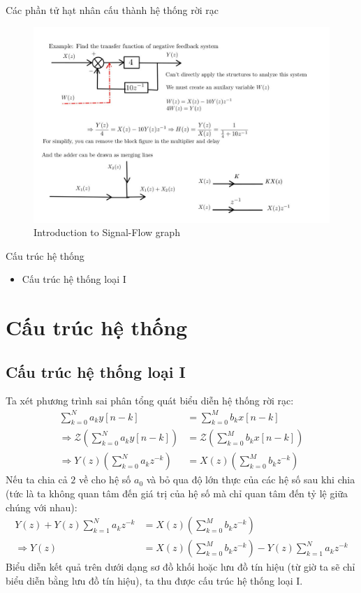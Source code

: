 \documentclass[8pt]{beamer}
\begin{document}
\begin{frame}{Các phần tử hạt nhân cấu thành hệ thống rời rạc}
\begin{figure}[h]
			\includegraphics[width=1\textwidth]{3.jpg}
			\caption{Introduction to Signal-Flow graph}			\label{fig:re3}

		\end{figure}
\end{frame}
\begin{frame}{Cấu trúc hệ thống}
\begin{itemize}
	\item Cấu trúc hệ thống loại I
\end{itemize}
\section{Cấu trúc hệ thống}
\subsection{Cấu trúc hệ thống loại I}
Ta xét phương trình sai phân tổng quát biểu diễn hệ thống rời rạc:
\begin{equation*}
	\begin{split}
		\sum_{k=0}^{N}a_{k}y[n-k]&=\sum_{k=0}^{M}b_{k}x[n-k]\\
		\Rightarrow \mathscr{Z}\left(\sum_{k=0}^{N}a_{k}y[n-k]\right)&=\mathscr{Z}\left(\sum_{k=0}^{M}b_{k}x[n-k]\right)\\
		\Rightarrow Y(z)\left(\sum_{k=0}^{N}a_{k}z^{-k}\right)&=X(z)\left(\sum_{k=0}^{M}b_{k}z^{-k}\right)
	\end{split}
\end{equation*}
Nếu ta chia cả $2$ về cho hệ số $a_{0}$ và bỏ qua độ lớn thực của các hệ số sau khi chia (tức là ta không quan tâm đến giá trị của hệ số mà chỉ quan tâm đến tỷ lệ giữa chúng với nhau):
\begin{equation*}
\begin{split}
	Y(z)+Y(z)\sum_{k=1}^{N}a_{k}z^{-k}&=X(z)\left(\sum_{k=0}^{M}b_{k}z^{-k}\right)\\
	\Rightarrow Y(z)&=X(z)\left(\sum_{k=0}^{M}b_{k}z^{-k}\right)-Y(z)\sum_{k=1}^{N}a_{k}z^{-k}
\end{split}
\end{equation*}
Biểu diễn kết quả trên dưới dạng sơ đồ khối hoặc lưu đồ tín hiệu (từ giờ ta sẽ chỉ biểu diễn bằng lưu đồ tín hiệu), ta thu được cấu trúc hệ thống loại I.
\end{frame}
\end{document}
